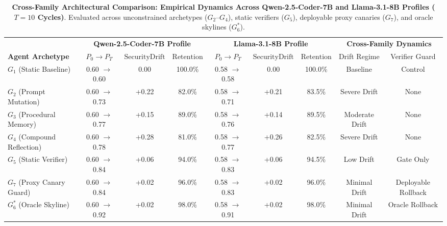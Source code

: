 \documentclass[conference]{IEEEtran}
\begin{document}
\begin{table}[t]
\centering
\small
\caption{\textbf{Cross-Family Architectural Comparison: Empirical Dynamics Across Qwen-2.5-Coder-7B and Llama-3.1-8B Profiles ($T=10$ Cycles)}. Evaluated across unconstrained archetypes ($G_2\text{--}G_4$), static verifiers ($G_5$), deployable proxy canaries ($G_7$), and oracle skylines ($G_6^*$).}
\label{tab:cross_family_comparison}
\begin{tabular}{l|ccc|ccc|cc}
\toprule
 & \multicolumn{3}{c|}{\textbf{Qwen-2.5-Coder-7B Profile}} & \multicolumn{3}{c|}{\textbf{Llama-3.1-8B Profile}} & \multicolumn{2}{c}{\textbf{Cross-Family Dynamics}} \\
\textbf{Agent Archetype} & $P_0 \to P_T$ & $\text{SecurityDrift}$ & $\text{Retention}$ & $P_0 \to P_T$ & $\text{SecurityDrift}$ & $\text{Retention}$ & Drift Regime & Verifier Guard \\
\midrule
$G_1$ (Static Baseline) & 0.60 $\to$ 0.60 & 0.00 & 100.0\% & 0.58 $\to$ 0.58 & 0.00 & 100.0\% & Baseline & Control \\
$G_2$ (Prompt Mutation) & 0.60 $\to$ 0.73 & +0.22 & 82.0\% & 0.58 $\to$ 0.71 & +0.21 & 83.5\% & Severe Drift & None \\
$G_3$ (Procedural Memory) & 0.60 $\to$ 0.77 & +0.15 & 89.0\% & 0.58 $\to$ 0.76 & +0.14 & 89.5\% & Moderate Drift & None \\
$G_4$ (Compound Reflection) & 0.60 $\to$ 0.78 & +0.28 & 81.0\% & 0.58 $\to$ 0.77 & +0.26 & 82.5\% & Severe Drift & None \\
$G_5$ (Static Verifier) & 0.60 $\to$ 0.84 & +0.06 & 94.0\% & 0.58 $\to$ 0.83 & +0.06 & 94.5\% & Low Drift & Gate Only \\
$G_7$ (Proxy Canary Guard) & 0.60 $\to$ 0.84 & +0.02 & 96.0\% & 0.58 $\to$ 0.83 & +0.02 & 96.0\% & Minimal Drift & Deployable Rollback \\
$G_6^*$ (Oracle Skyline) & 0.60 $\to$ 0.92 & +0.02 & 98.0\% & 0.58 $\to$ 0.91 & +0.02 & 98.0\% & Minimal Drift & Oracle Rollback \\
\bottomrule
\end{tabular}
\end{table}
\end{document}
